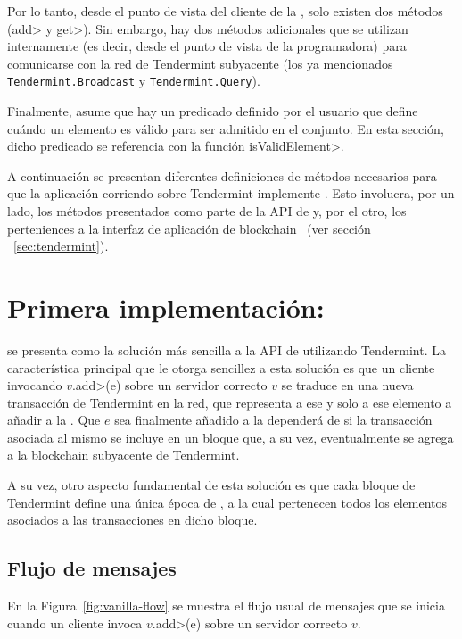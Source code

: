 
Por lo tanto, desde el punto de vista del cliente de la \setchain, solo existen dos
métodos (\<add> y \<get>).
%
Sin embargo, hay dos métodos adicionales que se utilizan internamente (es decir, desde
el punto de vista de la programadora) para comunicarse
con la red de Tendermint subyacente (los ya mencionados \texttt{Tendermint.Broadcast} y
\texttt{Tendermint.Query}).
%

Finalmente, \setchain asume que hay un predicado definido por el usuario que define
cuándo un elemento es válido para ser admitido en el conjunto.
%
En esta sección, dicho predicado se referencia con la función \<isValidElement>.

%
A continuación se presentan diferentes definiciones de métodos
necesarios para que la aplicación corriendo sobre Tendermint implemente \setchain.
Esto involucra, por un lado, los métodos presentados como parte de la API de
\setchain y, por el otro, los perteniences a la interfaz de aplicación de
blockchain ~(ver sección ~\ref{sec:tendermint}).

\section{Primera implementación: \vanilla}\label{sec:vanilla}

\vanilla se presenta como la solución más sencilla a la API de \setchain
utilizando Tendermint.
%
La característica principal que le otorga sencillez a esta solución es que
un cliente invocando $v.$\<add>(e) sobre un servidor correcto $v$ se
traduce en una nueva transacción de Tendermint en la red,
que representa a ese y solo a ese elemento a añadir a la \setchain.
%
Que $e$ sea finalmente añadido a la \setchain dependerá de si la transacción asociada
al mismo se incluye en un bloque que, a su vez, eventualmente se agrega a la blockchain
subyacente de Tendermint.

A su vez, otro aspecto fundamental de esta solución es que cada bloque de Tendermint
define una única época de \setchain, a la cual pertenecen todos los elementos asociados
a las transacciones en dicho bloque.

\subsection{Flujo de mensajes}
En la Figura~\ref{fig:vanilla-flow} se muestra el flujo usual de mensajes que se inicia
cuando un cliente invoca $v.$\<add>(e) sobre un servidor correcto $v$.
%

